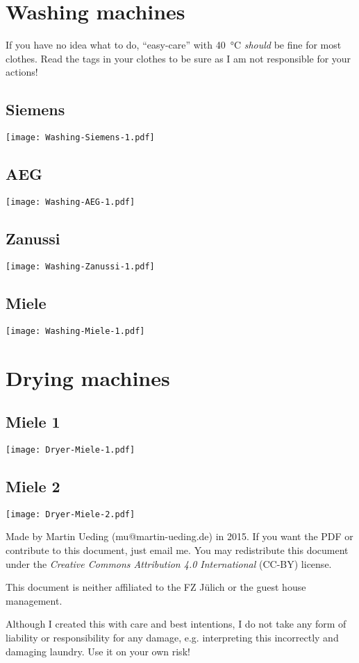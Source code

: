 \documentclass[11pt, english, fleqn, DIV=15, headinclude]{scrartcl}
\title{}
\author{
    Martin Ueding \\ \small{\href{mailto:mu@martin-ueding.de}{mu@martin-ueding.de}}
}
\begin{document}
\section*{Washing machines}

If you have no idea what to do, “easy-care” with \SI{40}{\celsius}
\emph{should} be fine for most clothes. Read the tags in your clothes to be
sure as I am not responsible for your actions!

\subsection*{Siemens}
\texttt{[image: Washing-Siemens-1.pdf]}

\subsection*{AEG}
\texttt{[image: Washing-AEG-1.pdf]}

\subsection*{Zanussi}
\texttt{[image: Washing-Zanussi-1.pdf]}

\subsection*{Miele}
\texttt{[image: Washing-Miele-1.pdf]}

\section*{Drying machines}

\subsection*{Miele 1}

\texttt{[image: Dryer-Miele-1.pdf]}

\subsection*{Miele 2}

\texttt{[image: Dryer-Miele-2.pdf]}


\vfill

\begin{small}
    Made by Martin Ueding (mu@martin-ueding.de) in 2015. If you want the PDF or
    contribute to this document, just email me. You may redistribute this
    document under the \emph{Creative Commons Attribution 4.0 International}
    (CC-BY) license.

    This document is neither affiliated to the FZ Jülich or the guest house
    management.

    Although I created this with care and best intentions, I do not take any
    form of liability or responsibility for any damage, e.g. interpreting this
    incorrectly and damaging laundry. Use it on your own risk!
\end{small}
\end{document}
